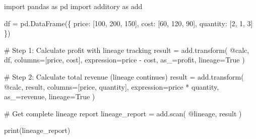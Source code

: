 \documentclass[
  letterpaper,
]{scrbook}
\newenvironment{Shaded}{\begin{snugshade}}{\end{snugshade}}
\newcommand{\BuiltInTok}[1]{\textcolor[rgb]{0.00,0.23,0.31}{#1}}
\newcommand{\CommentTok}[1]{\textcolor[rgb]{0.37,0.37,0.37}{#1}}
\newcommand{\DecValTok}[1]{\textcolor[rgb]{0.68,0.00,0.00}{#1}}
\newcommand{\ImportTok}[1]{\textcolor[rgb]{0.00,0.46,0.62}{#1}}
\newcommand{\NormalTok}[1]{\textcolor[rgb]{0.00,0.23,0.31}{#1}}
\newcommand{\OperatorTok}[1]{\textcolor[rgb]{0.37,0.37,0.37}{#1}}
\newcommand{\StringTok}[1]{\textcolor[rgb]{0.13,0.47,0.30}{#1}}
\newcommand{\VariableTok}[1]{\textcolor[rgb]{0.07,0.07,0.07}{#1}}
\begin{document}
\begin{Shaded}
\begin{Highlighting}[]
\ImportTok{import}\NormalTok{ pandas }\ImportTok{as}\NormalTok{ pd}
\ImportTok{import}\NormalTok{ additory }\ImportTok{as}\NormalTok{ add}

\NormalTok{df }\OperatorTok{=}\NormalTok{ pd.DataFrame(\{}
    \StringTok{\textquotesingle{}price\textquotesingle{}}\NormalTok{: [}\DecValTok{100}\NormalTok{, }\DecValTok{200}\NormalTok{, }\DecValTok{150}\NormalTok{],}
    \StringTok{\textquotesingle{}cost\textquotesingle{}}\NormalTok{: [}\DecValTok{60}\NormalTok{, }\DecValTok{120}\NormalTok{, }\DecValTok{90}\NormalTok{],}
    \StringTok{\textquotesingle{}quantity\textquotesingle{}}\NormalTok{: [}\DecValTok{2}\NormalTok{, }\DecValTok{1}\NormalTok{, }\DecValTok{3}\NormalTok{]}
\NormalTok{\})}

\CommentTok{\# Step 1: Calculate profit with lineage tracking}
\NormalTok{result }\OperatorTok{=}\NormalTok{ add.transform(}
    \StringTok{\textquotesingle{}@calc\textquotesingle{}}\NormalTok{,}
\NormalTok{    df,}
\NormalTok{    columns}\OperatorTok{=}\NormalTok{[}\StringTok{\textquotesingle{}price\textquotesingle{}}\NormalTok{, }\StringTok{\textquotesingle{}cost\textquotesingle{}}\NormalTok{],}
\NormalTok{    expression}\OperatorTok{=}\StringTok{\textquotesingle{}price {-} cost\textquotesingle{}}\NormalTok{,}
\NormalTok{    as\_}\OperatorTok{=}\StringTok{\textquotesingle{}profit\textquotesingle{}}\NormalTok{,}
\NormalTok{    lineage}\OperatorTok{=}\VariableTok{True}
\NormalTok{)}

\CommentTok{\# Step 2: Calculate total revenue (lineage continues)}
\NormalTok{result }\OperatorTok{=}\NormalTok{ add.transform(}
    \StringTok{\textquotesingle{}@calc\textquotesingle{}}\NormalTok{,}
\NormalTok{    result,}
\NormalTok{    columns}\OperatorTok{=}\NormalTok{[}\StringTok{\textquotesingle{}price\textquotesingle{}}\NormalTok{, }\StringTok{\textquotesingle{}quantity\textquotesingle{}}\NormalTok{],}
\NormalTok{    expression}\OperatorTok{=}\StringTok{\textquotesingle{}price * quantity\textquotesingle{}}\NormalTok{,}
\NormalTok{    as\_}\OperatorTok{=}\StringTok{\textquotesingle{}revenue\textquotesingle{}}\NormalTok{,}
\NormalTok{    lineage}\OperatorTok{=}\VariableTok{True}
\NormalTok{)}

\CommentTok{\# Get complete lineage report}
\NormalTok{lineage\_report }\OperatorTok{=}\NormalTok{ add.scan(}
    \StringTok{\textquotesingle{}@lineage\textquotesingle{}}\NormalTok{,}
\NormalTok{    result}
\NormalTok{)}

\BuiltInTok{print}\NormalTok{(lineage\_report)}
\end{Highlighting}
\end{Shaded}
\end{document}
